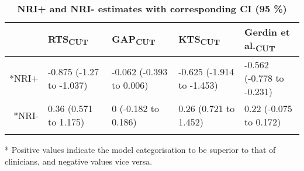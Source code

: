 \begin{table}[!ht]
\centering
\caption{\bf NRI+ and NRI- estimates with corresponding CI (95 \%)} 
\label{table:reclassification}
\begin{adjustbox}{max width = \linewidth} 
\begin{threeparttable} 
\begin{tabular} 
{rllll}
   & RTS\textsubscript{CUT} & GAP\textsubscript{CUT} & KTS\textsubscript{CUT} & Gerdin et al.\textsubscript{CUT} \\ 
  \midrule
*NRI+ & -0.875 (-1.27 to -1.037) & -0.062 (-0.393 to 0.006) & -0.625 (-1.914 to -1.453) & -0.562 (-0.778 to -0.231) \\ 
  *NRI- & 0.36 (0.571 to 1.175) & 0 (-0.182 to 0.186) & 0.26 (0.721 to 1.452) & 0.22 (-0.075 to 0.172) \\ 
   \bottomrule
\addlinespace 
\end{tabular} 
\begin{tablenotes} \footnotesize 
\item[*] Positive values indicate the model categorisation to be superior to that of clinicians, and negative values vice versa. 
\end{tablenotes} 
\end{threeparttable} 
\end{adjustbox}
\end{table}

